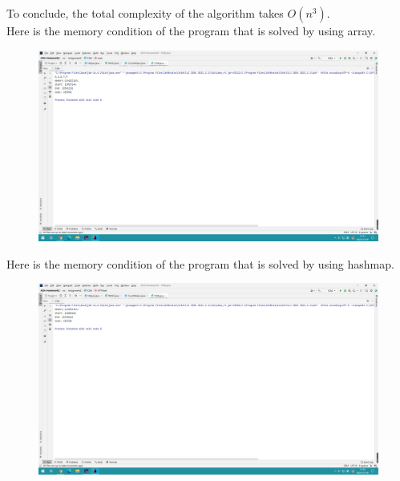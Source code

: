 \documentclass[]{article}
\begin{document}
	\noindent To conclude, the total complexity of the algorithm takes $O(n^{3})$.  \\
	
	\noindent Here is the memory condition of the program that is solved by using array. \\
	
	\begin{figure}[H]
		\centering
		\includegraphics[width=1\linewidth]{screen/A2-1}
		\caption{}
		\label{fig:a2-1}
	\end{figure}
	
	\noindent Here is the memory condition of the program that is solved by using hashmap. \\
	
	\begin{figure}[H]
		\centering
		\includegraphics[width=1\linewidth]{screen/A2-2}
		\caption{}
		\label{fig:a2-2}
	\end{figure}
	
	\clearpage
	
\end{document}
